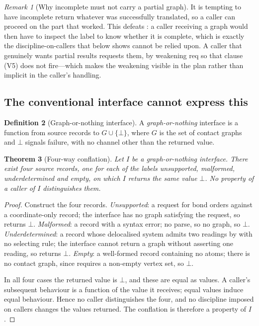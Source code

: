 \documentclass[11pt,twocolumn,a4paper]{article}
\theoremstyle{msthm}
\newtheorem{theorem}{Theorem}[section]
\theoremstyle{definition}
\newtheorem{definition}[theorem]{Definition}
\theoremstyle{remark}
\newtheorem{remark}[theorem]{Remark}
\newcommand{\Req}{\mathrm{req}}
\begin{document}
\begin{remark}[Why \textsf{incomplete} must not carry a partial graph]
\label{rem:no-partial}
It is tempting to have \textsf{incomplete} return whatever was
successfully translated, so a caller can proceed on the part that
worked. This defeats : a caller receiving a graph
would then have to inspect the label to know whether it is complete,
which is exactly the discipline-on-callers that 
below shows cannot be relied upon. A caller that genuinely wants partial
results requests them, by weakening $\Req$ so that clause (V5) does not
fire---which makes the weakening visible in the plan rather than
implicit in the caller's handling.
\end{remark}

\subsection{The conventional interface cannot express this}

\begin{definition}[Graph-or-nothing interface]
\label{def:gon}
A \emph{graph-or-nothing} interface is a function from source records to
$G\cup\{\bot\}$, where $G$ is the set of contact graphs and $\bot$
signals failure, with no channel other than the returned value.
\end{definition}

\begin{theorem}[Four-way conflation]
\label{thm:conflation}
Let $I$ be a graph-or-nothing interface. There exist four source
records, one for each of the labels \textsf{unsupported},
\textsf{malformed}, \textsf{underdetermined} and \textsf{empty}, on
which $I$ returns the same value $\bot$. No property of a caller of $I$
distinguishes them.
\end{theorem}

\begin{proof}
Construct the four records. \emph{Unsupported}: a request for bond
orders against a coordinate-only record; the interface has no graph
satisfying the request, so returns $\bot$. \emph{Malformed}: a record
with a syntax error; no parse, so no graph, so $\bot$.
\emph{Underdetermined}: a record whose delocalised system admits two
readings by  with no selecting rule; the interface
cannot return a graph without asserting one reading, so returns $\bot$.
\emph{Empty}: a well-formed record containing no atoms; there is no
contact graph, since  requires a non-empty vertex set,
so $\bot$.

In all four cases the returned value is $\bot$, and these are equal as
values. A caller's subsequent behaviour is a function of the value it
receives; equal values induce equal behaviour. Hence no caller
distinguishes the four, and no discipline imposed on callers changes the
values returned. The conflation is therefore a property of $I$.
\end{proof}
\end{document}
